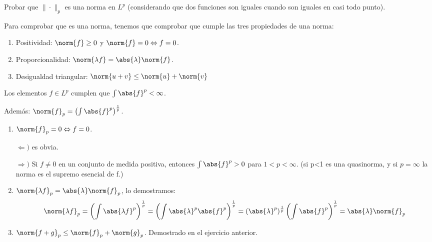 \begin{problem}[6] Probar que $\|\cdot\|_p$ es una norma en $L^p$ (considerando que dos funciones
son iguales
cuando son iguales en casi todo punto).
\solution

\begin{expla}
Para comprobar que es una norma, tenemos que comprobar que cumple las tres propiedades de una norma:
\begin{enumerate}
\item Positividad: $\norm{f}\geq 0$ y $\norm{f} = 0 \Leftrightarrow f=0$.
\item Proporcionalidad: $\norm{\lambda f} = \abs{\lambda}\norm{f}$.
\item Desigualdad triangular: $\norm{u+v} \leq \norm{u}+\norm{v}$     
\end{enumerate}

Los elementos $f \in L^p$ cumplen que $\int \abs{f}^p < \infty$. 

Además: $\norm{f}_p = \left( \int \abs{f}^p\right)^\frac{1}{p}$.
\end{expla}
\begin{enumerate}
\item  $\norm{f}_p = 0 \Leftrightarrow f=0$. 

$\Leftarrow)$ es obvia.

$\Rightarrow)$ Si $f \neq 0$ en un conjunto de medida positiva, entonces $\int \abs{f}^p >0$ para $1<p<\infty$. (si p<1 es una quasinorma, y si $p=\infty$ la norma es el supremo esencial de f.)
\item $\norm{\lambda f}_p=\abs{\lambda}\norm{f}_p$, lo demostramos: 
\[
\norm{\lambda f}_p =\left( \int \abs{\lambda f}^p \right)^{\frac{1}{p}} = \left( \int \abs{\lambda}^p \abs{f}^p\right)^{\frac{1}{p}} = (\abs{\lambda}^p)^{\frac{1}{p}} \left(\int \abs{f}^p\right)^{\frac{1}{p}} = \abs{\lambda} \norm{f}_p  
\]
\item $\norm{f+g}_p \leq \norm{f}_p+\norm{g}_p$.
Demostrado en el ejercicio anterior.
\end{enumerate}



\end{problem}


